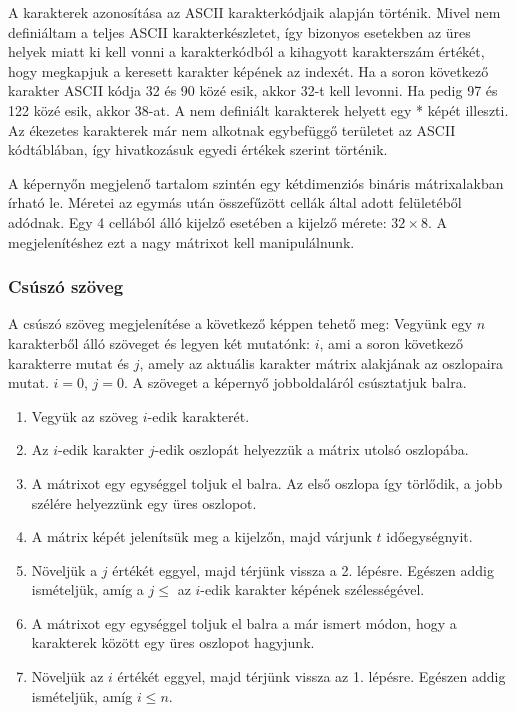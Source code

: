 \documentclass[a4paper, 12pt]{article}
\begin{document}
A karakterek azonosítása az ASCII karakterkódjaik alapján történik. Mivel nem definiáltam a teljes ASCII karakterkészletet, így bizonyos esetekben az üres helyek miatt ki kell vonni a karakterkódból a kihagyott karakterszám értékét, hogy megkapjuk a keresett karakter képének az indexét.
Ha a soron következő karakter ASCII kódja 32 és 90 közé esik, akkor 32-t kell levonni. Ha pedig 97 és 122 közé esik, akkor 38-at. A nem definiált karakterek helyett egy * képét illeszti.
Az ékezetes karakterek már nem alkotnak egybefüggő területet az ASCII kódtáblában, így hivatkozásuk egyedi értékek szerint történik.

A képernyőn megjelenő tartalom szintén egy kétdimenziós bináris mátrixalakban írható le. Méretei az egymás után összefűzött cellák által adott felületéből adódnak. Egy 4 cellából álló kijelző esetében a kijelző mérete: $32\times 8$.
A megjelenítéshez ezt a nagy mátrixot kell manipulálnunk.

\subsubsection{Csúszó szöveg}
A csúszó szöveg megjelenítése a következő képpen tehető meg:
Vegyünk egy $n$ karakterből álló szöveget és legyen két mutatónk: $i$, ami a soron következő karakterre mutat és $j$, amely az aktuális karakter mátrix alakjának az oszlopaira mutat. $i = 0$, $j = 0$.
A szöveget a képernyő jobboldaláról csúsztatjuk balra.
\begin{enumerate}
	\item Vegyük az szöveg $i$-edik karakterét.
	\item Az $i$-edik karakter $j$-edik oszlopát helyezzük a mátrix utolsó oszlopába.
	\item A mátrixot egy egységgel toljuk el balra. Az első oszlopa így törlődik, a jobb szélére helyezzünk egy üres oszlopot.
	\item A mátrix képét jelenítsük meg a kijelzőn, majd várjunk $t$ időegységnyit.
	\item Növeljük a $j$ értékét eggyel, majd térjünk vissza a 2. lépésre. Egészen addig ismételjük, amíg a $j \leq$ az $i$-edik karakter képének szélességével.
	\item A mátrixot egy egységgel toljuk el balra a már ismert módon, hogy a karakterek között egy üres oszlopot hagyjunk.
	\item Növeljük az $i$ értékét eggyel, majd térjünk vissza az 1. lépésre. Egészen addig ismételjük, amíg $i \leq n$.
\end{enumerate}
\end{document}
